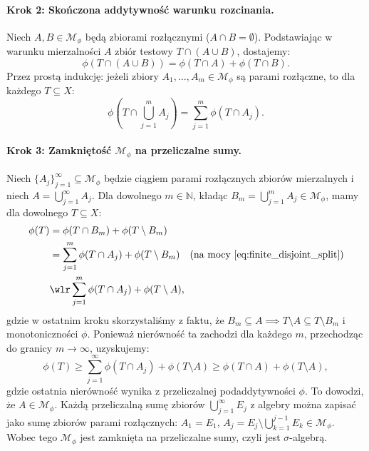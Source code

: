\begin{dow}
    \paragraph{Krok 2: Skończona addytywność warunku rozcinania.}
    Niech $A, B \in \mathcal{M}_\phi$ będą zbiorami rozłącznymi ($A \cap B = \emptyset$). Podstawiając w warunku mierzalności $A$ zbiór testowy $T \cap (A \cup B)$, dostajemy:
    \begin{equation}\label{eq:disjoint_split}
        \phi(T \cap (A \cup B)) = \phi(T \cap A) + \phi(T \cap B).
    \end{equation}
    Przez prostą indukcję: jeżeli zbiory $A_1, \dots, A_m \in \mathcal{M}_\phi$ są parami rozłączne, to dla każdego $T \subseteq X$:
    \begin{equation}\label{eq:finite_disjoint_split}
        \phi\left(T \cap \bigcup_{j=1}^m A_j\right) = \sum_{j=1}^m \phi(T \cap A_j).
    \end{equation}

    \paragraph{Krok 3: Zamkniętość $\mathcal{M}_\phi$ na przeliczalne sumy.}
    Niech $\{A_j\}_{j=1}^\infty \subseteq \mathcal{M}_\phi$ będzie ciągiem parami rozłącznych zbiorów mierzalnych i niech $A = \bigcup_{j=1}^\infty A_j$. Dla dowolnego $m \in \mathbb{N}$, kładąc $B_m = \bigcup_{j=1}^m A_j \in \mathcal{M}_\phi$, mamy dla dowolnego $T \subseteq X$:
    \begin{align}
        \phi(T) & = \phi(T \cap B_m) + \phi(T \setminus B_m)                                                                      \\
                & = \sum_{j=1}^m \phi(T \cap A_j) + \phi(T \setminus B_m) \quad \text{(na mocy \eqref{eq:finite_disjoint_split})} \\
                & \wlr \sum_{j=1}^m \phi(T \cap A_j) + \phi(T \setminus A),
    \end{align}
    gdzie w ostatnim kroku skorzystaliśmy z faktu, że $B_m \subseteq A \implies T \setminus A \subseteq T \setminus B_m$ i monotoniczności $\phi$.
    Ponieważ nierówność ta zachodzi dla każdego $m$, przechodząc do granicy $m \to \infty$, uzyskujemy:
    \begin{equation*}
        \phi(T) \ge \sum_{j=1}^\infty \phi(T \cap A_j) + \phi(T \setminus A) \ge \phi(T \cap A) + \phi(T \setminus A),
    \end{equation*}
    gdzie ostatnia nierówność wynika z przeliczalnej podaddytywności $\phi$. To dowodzi, że $A \in \mathcal{M}_\phi$. Każdą przeliczalną sumę zbiorów $\bigcup_{j=1}^\infty E_j$ z algebry można zapisać jako sumę zbiorów parami rozłącznych: $A_1 = E_1$, $A_j = E_j \setminus \bigcup_{k=1}^{j-1} E_k \in \mathcal{M}_\phi$.
    Wobec tego $\mathcal{M}_\phi$ jest zamknięta na przeliczalne sumy, czyli jest $\sigma$-algebrą.


\end{dow}
